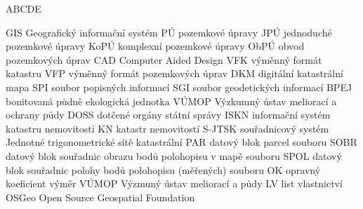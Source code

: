 
\begin{seznamzkratek}{ABCDE}

	      {GIS}
	      {Geografický informační systém}
	      {PÚ}
	      {pozemkové úpravy}
	      {JPÚ}
	      {jednoduché pozemkové úpravy}
	      {KoPÚ}
	      {komplexní pozemkové úpravy}
	      {ObPÚ}
	      {obvod pozemkových úprav}
	      {CAD}
	      {Computer Aided Design}
	      {VFK}
	      {výměnný formát katastru}
	      {VFP}
	      {výměnný formát pozemkových úprav}
	      {DKM}
	      {digitální katastrální mapa}
	      {SPI}
	      {soubor popisných informací}
	      {SGI}
	      {soubor geodetických informací}
	      {BPEJ}
	      {bonitovaná půdně ekologická jednotka}
	      {VÚMOP}
	      {Výzkumný ústav meliorací a ochrany půdy}
	      {DOSS}
	      {dotčené orgány státní správy}
	      {ISKN}
	      {informační systém katastru nemovitostí}
	      {KN}
	      {katastr nemovitostí}
	      {S-JTSK}
	      {souřadnicový systém Jednotné trigonometrické sítě katastrální}
	      {PAR}
	      {datový blok parcel souboru }
	      {SOBR}
	      {datový blok souřadnic obrazu bodů polohopisu v mapě souboru }
	      {SPOL}
	      {datový blok souřadnic polohy bodů polohopisu (měřených) souboru }
	      {OK}
	      {opravný koeficient výměr}
	      {VÚMOP}
	      {Výzmuný ústav meliorací a půdy}
	      {LV}
	      {list vlastnictví}
	      {OSGeo}
	      {Open Source Geospatial Foundation}
	      
\end{seznamzkratek}